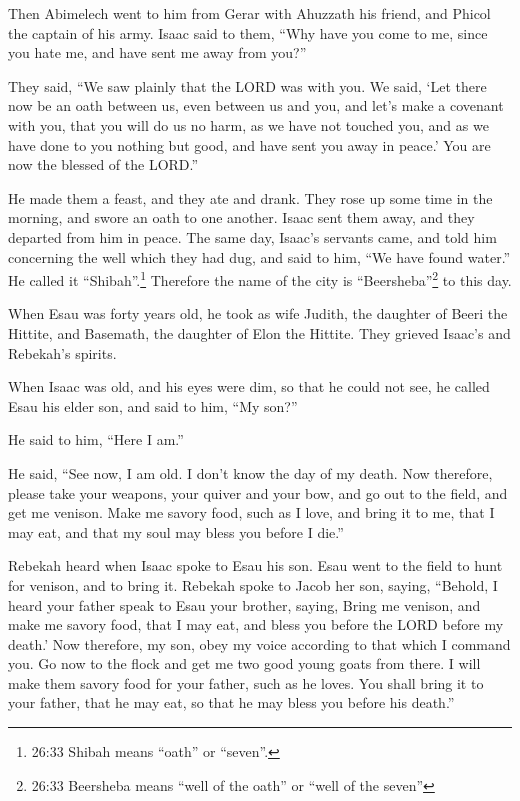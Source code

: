 \myverse{}Then Abimelech went to him from Gerar with Ahuzzath his friend, and Phicol the captain of his army. \myverse{}Isaac said to them, “Why have you come to me, since you hate me, and have sent me away from you?”

\myverse{}They said, “We saw plainly that the LORD was with you. We said, ‘Let there now be an oath between us, even between us and you, and let’s make a covenant with you, \myverse{}that you will do us no harm, as we have not touched you, and as we have done to you nothing but good, and have sent you away in peace.’ You are now the blessed of the LORD.”

\myverse{}He made them a feast, and they ate and drank. \myverse{}They rose up some time in the morning, and swore an oath to one another. Isaac sent them away, and they departed from him in peace. \myverse{}The same day, Isaac’s servants came, and told him concerning the well which they had dug, and said to him, “We have found water.” \myverse{}He called it “Shibah”.\footnote{26:33 Shibah means “oath” or “seven”.} Therefore the name of the city is “Beersheba”\footnote{26:33 Beersheba means “well of the oath” or “well of the seven”} to this day.

\myverse{}When Esau was forty years old, he took as wife Judith, the daughter of Beeri the Hittite, and Basemath, the daughter of Elon the Hittite. \myverse{}They grieved Isaac’s and Rebekah’s spirits.

\mychapter{}
\myverse*{}When Isaac was old, and his eyes were dim, so that he could not see, he called Esau his elder son, and said to him, “My son?”

He said to him, “Here I am.”

\myverse{}He said, “See now, I am old. I don’t know the day of my death. \myverse{}Now therefore, please take your weapons, your quiver and your bow, and go out to the field, and get me venison. \myverse{}Make me savory food, such as I love, and bring it to me, that I may eat, and that my soul may bless you before I die.”

\myverse{}Rebekah heard when Isaac spoke to Esau his son. Esau went to the field to hunt for venison, and to bring it. \myverse{}Rebekah spoke to Jacob her son, saying, “Behold, I heard your father speak to Esau your brother, saying, \myverse{}Bring me venison, and make me savory food, that I may eat, and bless you before the LORD before my death.’ \myverse{}Now therefore, my son, obey my voice according to that which I command you. \myverse{}Go now to the flock and get me two good young goats from there. I will make them savory food for your father, such as he loves. \myverse{}You shall bring it to your father, that he may eat, so that he may bless you before his death.”

